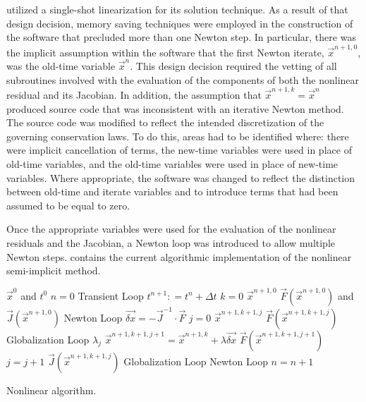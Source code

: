 \cobra{} utilized a single-shot linearization for its solution technique.
As a result of that design decision, memory saving techniques were employed in the construction of the software that precluded more than one Newton step.
In particular, there was the implicit assumption within the software that the first Newton iterate, $\vec{x}^{n+1, 0}$, was the old-time variable $\vec{x}^{n}$.
This design decision required the vetting of all subroutines involved with the evaluation of the components of both the nonlinear residual and its Jacobian.
In addition, the assumption that $\vec{x}^{n+1, k} = \vec{x}^{n}$ produced source code that was inconsistent with an iterative Newton method.
The source code was modified to reflect the intended discretization of the governing conservation laws.
To do this, areas had to be identified where: there were implicit cancellation of terms, the new-time variables were used in place of old-time variables, and the old-time variables were used in place of new-time variables.
Where appropriate, the software was changed to reflect the distinction between old-time and iterate variables and to introduce terms that had been assumed to be equal to zero.

Once the appropriate variables were used for the evaluation of the nonlinear residuals and the Jacobian, a Newton loop was introduced to allow multiple Newton steps.
 contains the current algorithmic implementation of the nonlinear semi-implicit method.

\begin{algo}[H]
\setlength{\baselineskip}{0.625\baselineskip}
\begin{algorithmic}[1]
\Require $\vec{x}^{0}$ and $t^{0}$
\Set $n = 0$
\Loop \; Transient Loop
    \State $t^{n+1} : = t^{n} + \Delta t$
    \State $k = 0$
    \Define $\vec{x}^{n+1,0}$
	\Calculate $\vec{F}(\vec{x}^{n+1,0})$ and $\vec{J}(\vec{x}^{n+1,0})$
    \Loop \; Newton Loop
		\Calculate $\vec{\delta x} = - \vec{J}^{-1}\cdot\vec{F}$
		$j = 0$		
		\Calculate $\vec{x}^{n+1,k+1,j}$
		\Calculate $\vec{F}(\vec{x}^{n+1,k+1,j})$
		\Loop \; Globalization Loop
				\Calculate $\lambda_j$
				\Calculate $\vec{x}^{n+1,k+1,j+1} = \vec{x}^{n+1,k} + \lambda \vec{\delta x}$
				\Calculate $\vec{F}(\vec{x}^{n+1,k+1,j+1})$
				\State $j = j + 1$			
			\Else
				\Calculate $\vec{J}(\vec{x}^{n+1,k+1,j})$
				\Exit Globalization Loop
			\EndIf
		\EndLoop			
			\Exit Newton Loop
		\EndIf
	\EndLoop
	\State $n = n + 1$
\EndLoop
\end{algorithmic}
\caption{Nonlinear \cobra{} algorithm.}
\label{alg:nl_cobra}
\end{algo}

